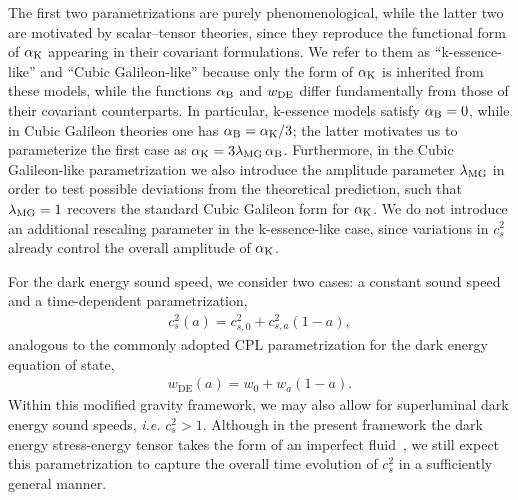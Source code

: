 \documentclass[%
reprint,
superscriptaddress,
preprint numbers,
nofootinbib,
amsmath,amssymb,
aps,
prd
]{revtex4-2}
\begin{document}
The first two parametrizations are purely phenomenological, while the latter two are motivated by scalar--tensor theories, since they reproduce the functional form of $\alpha_{\rm K}$ appearing in their covariant formulations. We refer to them as ``k-essence-like'' and ``Cubic Galileon-like'' because only the form of $\alpha_{\rm K}$ is inherited from these models, while the functions $\alpha_{\rm B}$ and $w_{\rm DE}$ differ fundamentally from those of their covariant counterparts. In particular, k-essence models satisfy $\alpha_{\rm B}=0$, while in Cubic Galileon theories one has $\alpha_{\rm B}=\alpha_{\rm K}/3$; the latter motivates us to parameterize the first case as $\alpha_{\rm K} = 3\lambda_{\rm MG}\,\alpha_{\rm B}$. Furthermore, in the Cubic Galileon-like parametrization we also introduce the amplitude parameter $\lambda_{\rm MG}$ in order to test possible deviations from the theoretical prediction, such that $\lambda_{\rm MG}=1$ recovers the standard Cubic Galileon form for $\alpha_{\rm K}$. We do not introduce an additional rescaling parameter in the k-essence-like case, since variations in $c_s^2$ already control the overall amplitude of $\alpha_{\rm K}$.

For the dark energy sound speed, we consider two cases: a constant sound speed and a time-dependent parametrization,
\begin{align}
    c_s^2(a) = c_{s,0}^2 + c_{s,a}^2(1-a),
\end{align}
analogous to the commonly adopted CPL parametrization for the dark energy equation of state,
\begin{align}
    w_\mathrm{DE}(a) = w_0 + w_a(1-a).
\end{align}
Within this modified gravity framework, we may also allow for superluminal dark energy sound speeds, \textit{i.e.} $c_s^2 > 1$. Although in the present framework the dark energy stress-energy tensor takes the form of an imperfect fluid~\cite{Deffayet:2010qz}, we still expect this parametrization to capture the overall time evolution of $c_s^2$ in a sufficiently general manner.
\end{document}
